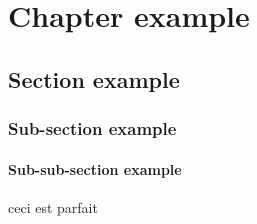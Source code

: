 \chapter{Chapter example}
    \section{Section example}
        \subsection{Sub-section example}
            \subsubsection{Sub-sub-section example}
			ceci est parfait
